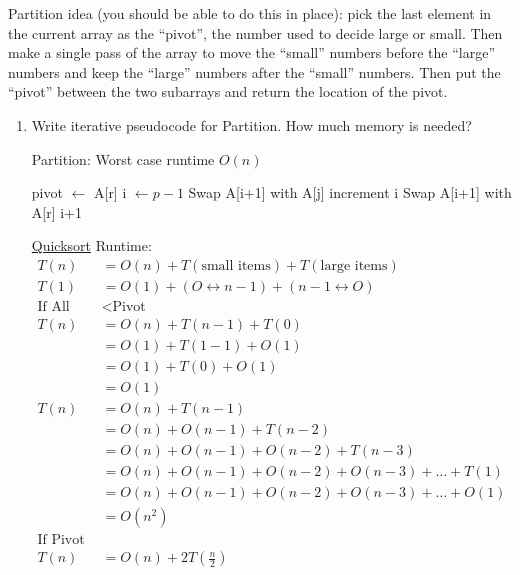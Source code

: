 \documentclass[12pt]{report}
\begin{document}
\noindent Partition idea (you should be able to do this in place): pick the last element in the current array as the ``pivot'', the number used to decide large or small. Then make a single pass of the array to move the ``small'' numbers before the ``large'' numbers and keep the ``large'' numbers after the ``small'' numbers. Then put the ``pivot'' between the two subarrays and return the location of the pivot.
\begin{enumerate}[label=\arabic*.,start=2]
    \item Write iterative pseudocode for Partition. How much memory is needed?\begin{algorithm}[H]
    		\caption{Partition: Worst case runtime $O(n)$}\label{alg:partition}
    		\begin{algorithmic}[1]
    			\State pivot $\gets$ A[r]
    			\State i $\gets p-1$
						\State Swap A[i+1] with A[j]
						\State increment i
					\EndIf
				\EndFor
			\State Swap A[i+1] with A[r]
			\State \Return i+1
    		\EndFunction
    		\end{algorithmic}
    	\end{algorithm} \hyperref[alg:quicksort]{Quicksort} Runtime: \begin{equation*}
    	\begin{aligned}
    		T(n) &= O(n) + T(\mbox{small items}) + T(\mbox{large items})\\
			T(1) &= O(1) + (O \leftrightarrow n-1) + (n-1 \leftrightarrow O)\\
			\mbox{If All Items} &< \mbox{Pivot}\\
				T(n) &= O(n) + T(n-1) + T(0)\\
					 &= O(1) + T(1-1) + O(1)\\
					 &= O(1) + T(0) + O(1)\\
					 &= O(1) \\
				T(n) &= O(n) + T(n-1)\\
					 &= O(n) + O(n-1) + T(n-2)\\
					 &= O(n) + O(n-1) + O(n-2) + T(n-3)\\
					 &= O(n) + O(n-1) + O(n-2) + O(n-3) + \dots + T(1)\\
					 &= O(n) + O(n-1) + O(n-2) + O(n-3) + \dots + O(1)\\
					 &= O\left( n^{2} \right)\\
			\mbox{If Pivot is Median}\\
				T(n) &= O(n) + 2T\left( \frac{n}{2} \right)\\

\end{aligned}
\end{equation*}
\end{enumerate}
\end{document}
